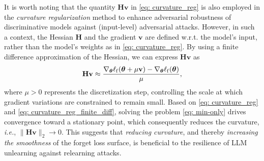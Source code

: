 It is worth noting that
the quantity $\mathbf{H} \mathbf{v}$ in \eqref{eq: curvature_reg} is also employed in the \textit{curvature regularization} method \citep{moosavi2019robustness} to enhance adversarial robustness of discriminative models against (input-level) adversarial attacks. However, in such a context, the Hessian $\mathbf{H}$ and the gradient $\mathbf{v}$ are defined w.r.t. the model's input, rather than the model's weights as in \eqref{eq: curvature_reg}.
By using a finite difference approximation of the Hessian, we can express $\mathbf{H} \mathbf{v}$ as 
\begin{align}
    \mathbf{H} \mathbf{v} \approx \frac{\nabla_{{\boldsymbol{\theta}}} \ell_{\mathrm{f}} ({\boldsymbol{\theta}} + \mu \mathbf v ) -\nabla_{{\boldsymbol{\theta}}} \ell_{\mathrm{f}} ({\boldsymbol{\theta}} ) }{\mu},
    \label{eq: curvature_reg_finite_diff}
\end{align}
where $\mu > 0$  represents the discretization step, controlling the scale at which gradient variations are constrained to remain small. 
Based on \eqref{eq: curvature_reg} and \eqref{eq: curvature_reg_finite_diff}, solving the problem \eqref{eq: min-only} drives convergence toward a stationary point, which consequently reduces the curvature, \textit{i.e.},   $\| \mathbf{H} \mathbf{v} \|_2 \to 0$.
This suggests that \textit{reducing curvature}, and thereby \textit{increasing the smoothness} of the forget loss surface, is beneficial to the resilience of LLM unlearning against relearning attacks.



